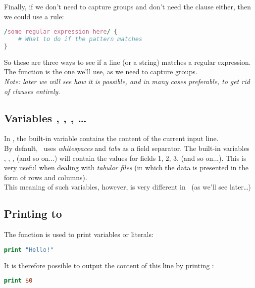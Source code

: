 Finally, if we don't need to capture groups and don't need the  clause either, then we could use a rule:
\begin{lstlisting}[language=awk]
/some regular expression here/ {
	# What to do if the pattern matches
}
\end{lstlisting}

\medskip


So these are three ways to see if a line (or a string) matches a regular expression. The  function is the one we'll use, as we need to capture groups. \\


\emph{Note: later we will see how it is possible, and in many cases preferable, to get rid of  clauses entirely.}




\subsection*{Variables , , , \dots}

In \awk, the built-in variable  contains the content of the current input line. \\

By default, \awk\ uses \emph{whitespaces} and \emph{tabs} as a field separator.
The built-in variables , , , (and so on...) will contain the values for fields 1, 2, 3, (and so on...). This is very useful when dealing with \emph{tabular files} (in which the data is presented in the form of rows and columns). \\

This meaning of such variables, however, is very different in \perl\ (as we'll see later\dots)


\subsection*{Printing to \stdout}

The  function is used to print variables or literals:

\begin{lstlisting}[language=awk]
print "Hello!"
\end{lstlisting}

It is therefore possible to output the content of this line by printing :

\begin{lstlisting}[language=awk]
print $0
\end{lstlisting}

